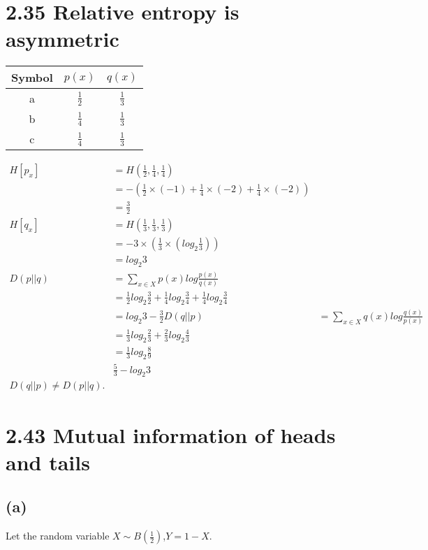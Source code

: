 \documentclass{article}
\begin{document}
\section{2.35 Relative entropy is asymmetric}

\begin{center}
    \begin{tabular}{|c|c|c|}
    \hline
    Symbol&$p(x)$&$q(x)$\\ \hline
    a&$\frac{1}{2}$&$\frac{1}{3}$\\ \hline
    b&$\frac{1}{4}$&$\frac{1}{3}$\\ \hline
    c&$\frac{1}{4}$&$\frac{1}{3}$\\ \hline
    \end{tabular}
\end{center}
\begin{align}
H[p_x]&=H(\frac{1}{2},\frac{1}{4},\frac{1}{4})\\
      &=-(\frac{1}{2}\times(-1)+\frac{1}{4}\times(-2)+\frac{1}{4}\times(-2))\\
      &=\frac{3}{2}\\
H[q_x]&=H(\frac{1}{3},\frac{1}{3},\frac{1}{3})\\
      &=-3\times(\frac{1}{3}\times(log_2 \frac{1}{3}))\\
      &=log_2 3\\
D(p||q)&=\sum_{x\in X}p(x)log\frac{p(x)}{q(x)}\\
       &=\frac{1}{2}log_2\frac{3}{2}+\frac{1}{4}log_2\frac{3}{4}+\frac{1}{4}log_2\frac{3}{4}\\
       &=log_2 3-\frac{3}{2}
D(q||p)&=\sum_{x\in X}q(x)log\frac{q(x)}{p(x)}\\
       &=\frac{1}{3}log_2\frac{2}{3}+\frac{2}{3}log_2\frac{4}{3}\\
       &=\frac{1}{3}log_2\frac{8}{9}\\
       &\frac{5}{3}-log_2 3\\
D(q||p)\neq D(p||q).
\end{align}

\section{2.43 Mutual information of heads and tails}
\subsection{(a)}
Let the random variable $X\sim B(\frac{1}{2})$,$Y=1-X$.
\end{document}
